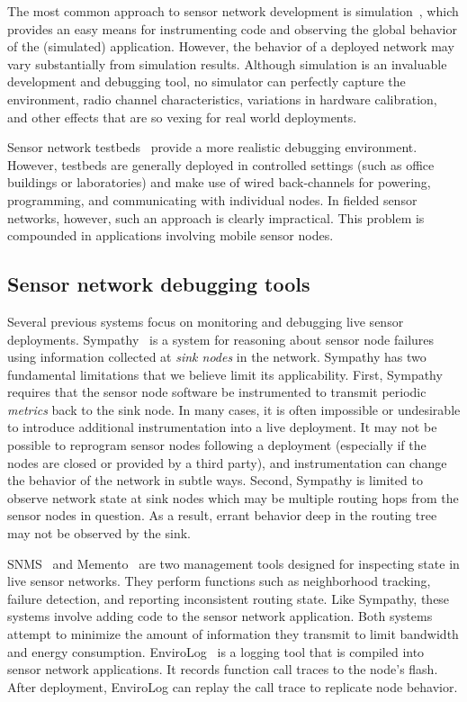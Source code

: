 The most common approach to sensor network development is 
simulation~\cite{tossim,ptossim,avrora}, which provides 
an easy means for instrumenting code and observing the global
behavior of the (simulated) application. 
However, the behavior of a deployed network 
may vary substantially from simulation results. Although simulation
is an invaluable development and debugging tool, no simulator can
perfectly capture the environment, radio channel characteristics,
variations in hardware calibration, and other effects that are so
vexing for real world deployments.

Sensor network testbeds~\cite{mirage,motelab,emstar,emulab} provide a
more realistic debugging environment. However, testbeds are generally
deployed in controlled settings (such as office buildings or
laboratories) and make use of wired back-channels for powering, 
programming, and communicating with individual nodes. In fielded
sensor networks, however, such an approach is clearly impractical.
This problem is compounded in applications involving mobile sensor
nodes.


\subsection{Sensor network debugging tools}
Several previous systems focus on monitoring
and debugging live sensor deployments. Sympathy~\cite{sympathy} is a
system for reasoning about sensor node failures using information 
collected at {\em sink nodes} in the network. Sympathy has two
fundamental limitations that we believe limit its applicability.
First, Sympathy requires that the sensor node software be instrumented 
to transmit periodic {\em metrics} back to the sink node. 
In many cases, it is often
impossible or undesirable to introduce additional instrumentation
into a live deployment. It may not be possible to reprogram sensor
nodes following a deployment (especially if the nodes are closed or
provided by a third party), and instrumentation can change the 
behavior of the network in subtle ways. Second, Sympathy is limited to 
observe network state at sink nodes which may be multiple routing hops 
from the sensor nodes in question. As a result, errant behavior 
deep in the routing tree may not be observed by the sink. 

SNMS~\cite{snms-ewsn05} and Memento~\cite{rost2006memento} are two 
management tools designed for inspecting state in live sensor 
networks. They perform functions such as neighborhood tracking,
failure detection, and reporting inconsistent routing state.
Like Sympathy, these systems involve adding code to the sensor
network application. Both systems attempt to minimize the 
amount of information they transmit to limit bandwidth and energy consumption.
EnviroLog~\cite{envirolog} is a logging tool that is compiled into 
sensor network applications. It records function call traces to the
node's flash. After deployment, EnviroLog can replay the call trace 
to replicate node behavior.

